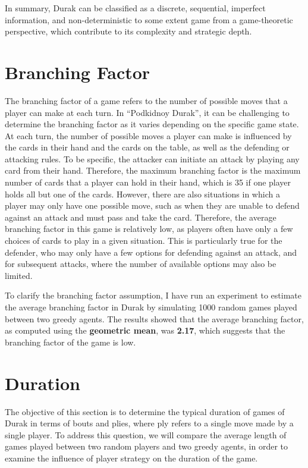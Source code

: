 In summary, Durak can be classified as a discrete, sequential, imperfect information, and non-deterministic to some extent game from a game-theoretic perspective, which contribute to its complexity and strategic depth.


\section{Branching Factor}

The branching factor of a game refers to the number of possible moves that a player can make at each turn. In ``Podkidnoy Durak'', it can be challenging to determine the branching factor as it varies depending on the specific game state. At each turn, the number of possible moves a player can make is influenced by the cards in their hand and the cards on the table, as well as the defending or attacking rules. To be specific, the attacker can initiate an attack by playing any card from their hand. Therefore, the maximum branching factor is the maximum number of cards that a player can hold in their hand, which is 35 if one player holds all but one of the cards. However, there are also situations in which a player may only have one possible move, such as when they are unable to defend against an attack and must pass and take the card. Therefore, the average branching factor in this game is relatively low, as players often have only a few choices of cards to play in a given situation. This is particularly true for the defender, who may only have a few options for defending against an attack, and for subsequent attacks, where the number of available options may also be limited.

To clarify the branching factor assumption, I have run an experiment to estimate the average branching factor in Durak by simulating 1000 random games played between two greedy agents. The results showed that the average branching factor, as computed using the \textbf{geometric mean}, was \textbf{2.17}, which suggests that the branching factor of the game is low. 

\section{Duration}

The objective of this section is to determine the typical duration of games of Durak in terms of bouts and plies, where ply refers to a single move made by a single player. To address this question, we will compare the average length of games played between two random players and two greedy agents, in order to examine the influence of player strategy on the duration of the game.

